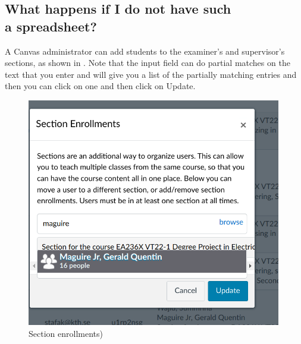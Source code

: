 \subsection[What happens if I do not have such a spreadsheet?]{What happens if I do not have such\\ a spreadsheet?}

A Canvas administrator can add students to the examiner’s and supervisor’s sections, as shown in . Note that the input field can do partial matches on the text that you enter and will give you a list of the partially matching entries and then you can click on one and then click on Update. 
 	
\begin{figure}[!ht]
  \begin{center}
    \includegraphics[width=0.99\textwidth]{README_notes/README-examiner-figures/edit-sections-Screenshot_20220325_161529.png}
  \end{center}
  \caption{Section enrollments)}
  \label{fig:sectionEntrollments}
\end{figure}
\FloatBarrier

